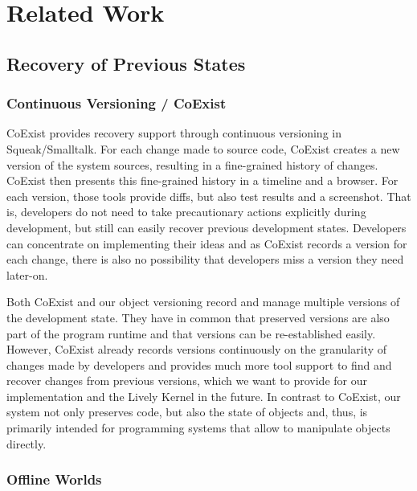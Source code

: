 \chapter{Related Work} \label{chapter:RELATED_WORK}



\section{Recovery of Previous States}



\subsection{Continuous Versioning / CoExist}

\cite{Steinert2012COE}
CoExist provides recovery support through continuous versioning in Squeak/Smalltalk.
For each change made to source code, CoExist creates a new version of the system sources, resulting in a fine-grained history of changes.
CoExist then presents this fine-grained history in a timeline and a browser.
For each version, those tools provide diffs, but also test results and a screenshot.
That is, developers do not need to take precautionary actions explicitly during development, but still can easily recover previous development states.
Developers can concentrate on implementing their ideas and as CoExist records a version for each change, there is also no possibility that developers miss a version they need later-on.

Both CoExist and our object versioning record and manage multiple versions of the development state.
They have in common that preserved versions are also part of the program runtime and that versions can be re-established easily.
However, CoExist already records versions continuously on the granularity of changes made by developers and provides much more tool support to find and recover changes from previous versions, which we want to provide for our implementation and the Lively Kernel in the future.
In contrast to CoExist, our system not only preserves code, but also the state of objects and, thus, is primarily intended for programming systems that allow to manipulate objects directly.


\subsection{Offline Worlds}

